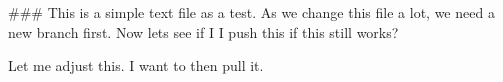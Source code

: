 ###
This is a simple text file as a test.
As we change this file a lot, we need a new branch first.
Now lets see if I I push this if this still works?

Let me adjust this. I want to then pull it.

